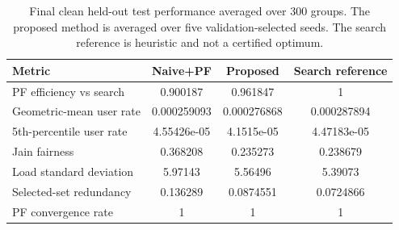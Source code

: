 \begin{table}[t]
\centering
\caption{Final clean held-out test performance averaged over 300 groups. The proposed method is averaged over five validation-selected seeds. The search reference is heuristic and not a certified optimum.}
\label{tab:clean_final_test}
\begin{tabular}{lccc}
\toprule
Metric & Naive+PF & Proposed & Search reference \\
\midrule
PF efficiency vs search & 0.900187 & 0.961847 & 1 \\
Geometric-mean user rate & 0.000259093 & 0.000276868 & 0.000287894 \\
5th-percentile user rate & 4.55426e-05 & 4.1515e-05 & 4.47183e-05 \\
Jain fairness & 0.368208 & 0.235273 & 0.238679 \\
Load standard deviation & 5.97143 & 5.56496 & 5.39073 \\
Selected-set redundancy & 0.136289 & 0.0874551 & 0.0724866 \\
PF convergence rate & 1 & 1 & 1 \\
\bottomrule
\end{tabular}
\end{table}